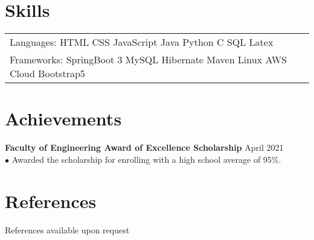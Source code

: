 \documentclass[letterpaper,12pt]{article}
\begin{document}
\section{Skills}
\begin{tabularx}{\linewidth}{@{}l X@{}}
Languages: \hspace{0.4cm} HTML   \hspace{0.6cm}   CSS \hspace{0.6cm} JavaScript \hspace{0.6cm} Java \hspace{0.6cm} Python \hspace{0.6cm} C \hspace{0.6cm} SQL \hspace{0.6cm} Latex \\
Frameworks: \hspace{0.2cm} SpringBoot 3 \hspace{0.2cm} MySQL \hspace{0.2cm} Hibernate \hspace{0.2cm} Maven \hspace{0.2cm} Linux \hspace{0.3cm} AWS Cloud \hspace{0.5cm}Bootstrap5
\end{tabularx}

\section{Achievements}
\textbf{Faculty of Engineering Award of Excellence Scholarship}  \hfill  \normalsize{April 2021} \\
$\bullet$ Awarded the scholarship for enrolling with a high school average of 95\%.
\section{References}
References available upon request
\end{document}

